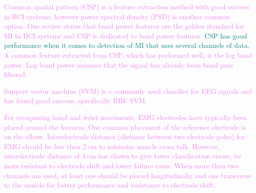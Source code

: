 \textcolor{violet}{Common spatial pattern (CSP) is a feature extraction method with good success in BCI systems\:\cite{gordleevaRealTimeEEGEMG2020}\cite{blankertzOptimizingSpatialFilters2008}, however power spectral density (PSD) is another common option\:\cite{fouadBrainComputerInterface2015}.}
\textcolor{violet}{One review states that band power features are the golden standard for MI in BCI systems and CSP is dedicated to band power features\:\cite{lotteReviewClassificationAlgorithms2018}.}
\textcolor{teal}{CSP has good performance when it comes to detection of MI that uses several channels of data\:\cite{kevricComparisonSignalDecomposition2017}.}
\textcolor{violet}{A common feature extracted from CSP, which has performed well, is the log band power\:\cite{fouadBrainComputerInterface2015}\cite{blankertzOptimizingSpatialFilters2008}\cite{aljalalFeatureExtractionEEG2018}. Log band power assumes that the signal has already been band pass filtered\:\cite{blankertzOptimizingSpatialFilters2008}.}

\textcolor{violet}{Support vector machine (SVM) is a commonly used classifier for EEG signals and has found good success\:\cite{hongHybridBrainComputer2017}\cite{khoslaComparativeAnalysisSignal2020}\cite{zhangEEGEMGEOGBased2019}, specifically RBF SVM\:\cite{fouadBrainComputerInterface2015}.}


\textcolor{violet}{For recognizing hand and wrist movements, EMG electrodes have typically been placed around the forearm\:\cite{leebHybridBrainComputer2011}\cite{zhangEEGEMGEOGBased2019}\cite{farinaExtractionNeuralInformation2014}\cite{youngClassificationSimultaneousMovements2013}\cite{liQuantifyingPatternRecognition2010}.}
\textcolor{violet}{One common placement of the reference electrode is on the elbow\:\cite{youngClassificationSimultaneousMovements2013}\cite{youngImprovingMyoelectricPattern2012}.}
\textcolor{violet}{Interelectrode distance (distance between two electrode poles) for EMG should be less than $2\:\text{cm}$ to minimize muscle cross talk\:\cite{youngImprovingMyoelectricPattern2012}. However, interelectrode distance of $4\:\text{cm}$ has shown to give lower classification errors, be more resistant to electrode shift and lower failure rates\:\cite{youngImprovingMyoelectricPattern2012}.}
\textcolor{violet}{When more than two channels are used, at least one should be placed longitudinally and one transverse to the muscle for better performance and resistance to electrode shift\:\cite{youngImprovingMyoelectricPattern2012}.}

